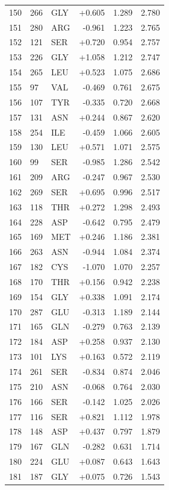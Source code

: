 \begin{longtable}{r l l r r r}
150 & 266 & GLY & +0.605 & 1.289 & 2.780 \\
151 & 280 & ARG & -0.961 & 1.223 & 2.765 \\
152 & 121 & SER & +0.720 & 0.954 & 2.757 \\
153 & 226 & GLY & +1.058 & 1.212 & 2.747 \\
154 & 265 & LEU & +0.523 & 1.075 & 2.686 \\
155 & 97 & VAL & -0.469 & 0.761 & 2.675 \\
156 & 107 & TYR & -0.335 & 0.720 & 2.668 \\
157 & 131 & ASN & +0.244 & 0.867 & 2.620 \\
158 & 254 & ILE & -0.459 & 1.066 & 2.605 \\
159 & 130 & LEU & +0.571 & 1.071 & 2.575 \\
160 & 99 & SER & -0.985 & 1.286 & 2.542 \\
161 & 209 & ARG & -0.247 & 0.967 & 2.530 \\
162 & 269 & SER & +0.695 & 0.996 & 2.517 \\
163 & 118 & THR & +0.272 & 1.298 & 2.493 \\
164 & 228 & ASP & -0.642 & 0.795 & 2.479 \\
165 & 169 & MET & +0.246 & 1.186 & 2.381 \\
166 & 263 & ASN & -0.944 & 1.084 & 2.374 \\
167 & 182 & CYS & -1.070 & 1.070 & 2.257 \\
168 & 170 & THR & +0.156 & 0.942 & 2.238 \\
169 & 154 & GLY & +0.338 & 1.091 & 2.174 \\
170 & 287 & GLU & -0.313 & 1.189 & 2.144 \\
171 & 165 & GLN & -0.279 & 0.763 & 2.139 \\
172 & 184 & ASP & +0.258 & 0.937 & 2.130 \\
173 & 101 & LYS & +0.163 & 0.572 & 2.119 \\
174 & 261 & SER & -0.834 & 0.874 & 2.046 \\
175 & 210 & ASN & -0.068 & 0.764 & 2.030 \\
176 & 166 & SER & -0.142 & 1.025 & 2.026 \\
177 & 116 & SER & +0.821 & 1.112 & 1.978 \\
178 & 148 & ASP & +0.437 & 0.797 & 1.879 \\
179 & 167 & GLN & -0.282 & 0.631 & 1.714 \\
180 & 224 & GLU & +0.087 & 0.643 & 1.643 \\
181 & 187 & GLY & +0.075 & 0.726 & 1.543 \\
\hline
\end{longtable}
